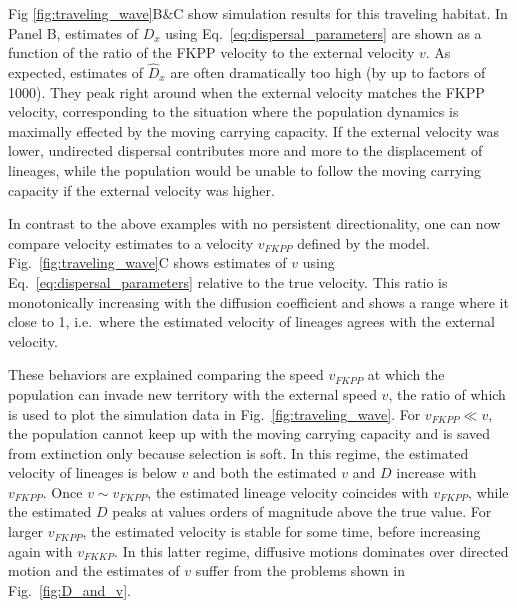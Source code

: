 \documentclass[aps,rmp, twocolumn]{revtex4}
\begin{document}
Fig \ref{fig:traveling_wave}B\&C show simulation results for this traveling habitat. In Panel B, estimates of $D_x$ using Eq.~\ref{eq:dispersal_parameters} are shown as a function of the ratio of the FKPP velocity to the external velocity $v$.
As expected, estimates of $\hat{D}_x$ are often dramatically too high (by up to factors of 1000).
They peak right around when the external velocity matches the FKPP velocity, corresponding to the situation where the population dynamics is maximally effected by the moving carrying capacity.
If the external velocity was lower, undirected dispersal contributes more and more to the displacement of lineages, while the population would be unable to follow the moving carrying capacity if the external velocity was higher.

In contrast to the above examples with no persistent directionality, one can now compare velocity estimates to a velocity $v_{FKPP}$ defined by the model.
Fig.~\ref{fig:traveling_wave}C shows estimates of $v$ using Eq.~\ref{eq:dispersal_parameters} relative to the true velocity.
This ratio is monotonically increasing with the diffusion coefficient and shows a range where it close to 1, i.e.~where the estimated velocity of lineages agrees with the external velocity.

These behaviors are explained comparing the speed $v_{FKPP}$ at which the population can invade new territory with the external speed $v$, the ratio of which is used to plot the simulation data in Fig.~\ref{fig:traveling_wave}.
For $v_{FKPP} \ll v$, the population cannot keep up with the moving carrying capacity and is saved from extinction only because selection is soft.
In this regime, the estimated velocity of lineages is below $v$ and both the estimated $v$ and $D$ increase with $v_{FKPP}$.
Once $v\sim v_{FKPP}$, the estimated lineage velocity coincides with $v_{FKPP}$, while the estimated $D$ peaks at values orders of magnitude above the true value.
For larger $v_{FKPP}$, the estimated velocity is stable for some time, before increasing again with $v_{FKKP}$.
In this latter regime, diffusive motions dominates over directed motion and the estimates of $v$ suffer from the problems shown in Fig.~\ref{fig:D_and_v}.
\end{document}
